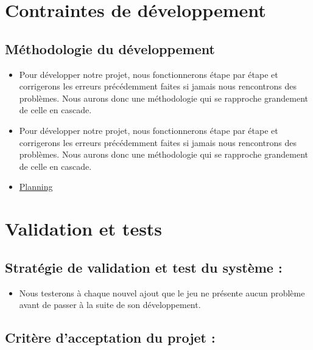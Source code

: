 \documentclass{report}
\begin{document}
\vspace{1cm} 

\section{Contraintes de développement}

\vspace{0.5cm}

\subsection{Méthodologie du développement}

\begin{itemize}[label={\textbf{--}}]
    \item Pour développer notre projet, nous fonctionnerons étape par étape et corrigerons les erreurs précédemment faites si jamais nous rencontrons des problèmes. Nous aurons donc une méthodologie qui se rapproche grandement de celle en cascade.
    \item Pour développer notre projet, nous fonctionnerons étape par étape et corrigerons les erreurs précédemment faites si jamais nous rencontrons des problèmes. Nous aurons donc une méthodologie qui se rapproche grandement de celle en cascade.
    \item \href{https://ibb.co/9bTFNWF}{Planning}
\end{itemize}

\vspace{1cm}

\section{Validation et tests}

\vspace{0.5cm}

\subsection{Stratégie de validation et test du système :}

\begin{itemize}[label={\textbf{--}}]
    \item Nous testerons à chaque nouvel ajout que le jeu ne présente aucun problème avant de passer à la suite de son développement.
\end{itemize}

\subsection{Critère d’acceptation du projet :}
\end{document}
